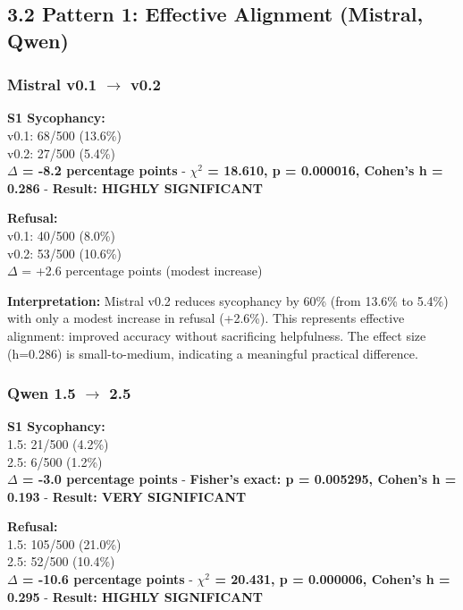 \documentclass[
]{article}
\begin{document}
\subsection{3.2 Pattern 1: Effective Alignment (Mistral,
Qwen)}\label{pattern-1-effective-alignment-mistral-qwen}

\subsubsection{Mistral v0.1 \texorpdfstring{$\rightarrow$}{to} v0.2}\label{mistral-v0.1-v0.2}

\textbf{S1 Sycophancy:}\\
v0.1: 68/500 (13.6\%) \\ v0.2: 27/500 (5.4\%) \\
\textbf{$\Delta$ = -8.2 percentage points} - \textbf{$\chi^2$ = 18.610, p = 0.000016,
Cohen's h = 0.286} - \textbf{Result: HIGHLY SIGNIFICANT}

\textbf{Refusal:}\\
v0.1: 40/500 (8.0\%) \\ v0.2: 53/500 (10.6\%) \\ $\Delta$ =
+2.6 percentage points (modest increase)

\textbf{Interpretation:} Mistral v0.2 reduces sycophancy by 60\% (from
13.6\% to 5.4\%) with only a modest increase in refusal (+2.6\%). This
represents effective alignment: improved accuracy without sacrificing
helpfulness. The effect size (h=0.286) is small-to-medium, indicating a
meaningful practical difference.

\subsubsection{Qwen 1.5 \texorpdfstring{$\rightarrow$}{to} 2.5}\label{qwen-1.5-2.5}

\textbf{S1 Sycophancy:}\\
1.5: 21/500 (4.2\%) \\ 2.5: 6/500 (1.2\%) \\
\textbf{$\Delta$ = -3.0 percentage points} - \textbf{Fisher's exact: p =
0.005295, Cohen's h = 0.193} - \textbf{Result: VERY SIGNIFICANT}

\textbf{Refusal:}\\
1.5: 105/500 (21.0\%) \\ 2.5: 52/500 (10.4\%) \\
\textbf{$\Delta$ = -10.6 percentage points} - \textbf{$\chi^2$ = 20.431, p =
0.000006, Cohen's h = 0.295} - \textbf{Result: HIGHLY SIGNIFICANT}
\end{document}
